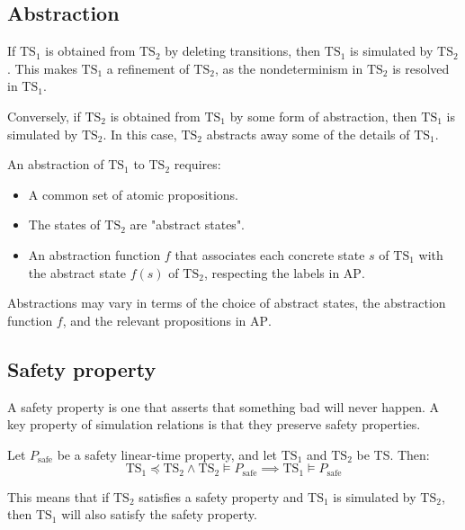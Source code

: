 \subsection{Abstraction}
\begin{definition}
    If $\text{TS}_1$ is obtained from $\text{TS}_2$ by deleting transitions, then $\text{TS}_1$ is simulated by $\text{TS}_2$. 
    This makes $\text{TS}_1$ a refinement of $\text{TS}_2$, as the nondeterminism in $\text{TS}_2$ is resolved in $\text{TS}_1$.
\end{definition}


\begin{definition}
    Conversely, if $\text{TS}_2$ is obtained from $\text{TS}_1$ by some form of abstraction, then $\text{TS}_1$ is simulated by $\text{TS}_2$.
    In this case, $\text{TS}_2$ abstracts away some of the details of $\text{TS}_1$.
\end{definition}
\noindent An abstraction of $\text{TS}_1$ to $\text{TS}_2$ requires:
\begin{itemize}
    \item A common set of atomic propositions.
    \item The states of $\text{TS}_2$ are "abstract states".
    \item An abstraction function $f$ that associates each concrete state $s$ of $\text{TS}_1$ with the abstract state $f(s)$ of $\text{TS}_2$, respecting the labels in $\text{AP}$.
\end{itemize}
\noindent Abstractions may vary in terms of the choice of abstract states, the abstraction function $f$, and the relevant propositions in $\text{AP}$.




\subsection{Safety property}
A safety property is one that asserts that something bad will never happen. 
A key property of simulation relations is that they preserve safety properties.
\begin{property}
    Let $P_{\text{safe}}$ be a safety linear-time property, and let $\text{TS}_1$ and $\text{TS}_2$ be TS.
    Then:
    \[\text{TS}_1\preceq \text{TS}_2\land\text{TS}_2\models P_{\text{safe}}\implies\text{TS}_1\models P_{\text{safe}} \]
\end{property}
\noindent This means that if $\text{TS}_2$ satisfies a safety property and $\text{TS}_1$ is simulated by $\text{TS}_2$, then $\text{TS}_1$ will also satisfy the safety property.

